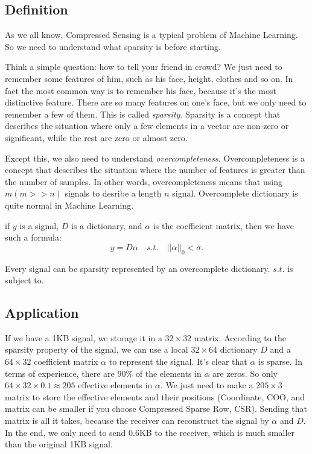 \documentclass[10pt,a4paper,oneside,numbers=noenddot]{scrbook}
\theoremstyle{ctplain}
\theoremstyle{ctresult}
\begin{document}
\subsection{Definition}

As we all know, Compressed Sensing is a typical problem of Machine Learning. So we need
to understand what sparsity is before starting.

Think a simple question: how to tell your friend in crowd? We just need to remember some
features of him, such as his face, height, clothes and so on. In fact the most common way
is to remember his face, because it's the most distinctive feature. There are so many
features on one's face, but we only need to remember a few of them. This is called
\emph{sparsity}. Sparsity is a concept that describes the situation where only a few
elements in a vector are non-zero or significant, while the rest are zero or almost zero.

Except this, we also need to understand \emph{overcompleteness}. Overcompleteness is a
concept that describes the situation where the number of features is greater than the
number of samples. In other words, overcompleteness means that using $m (m>>n)$ signals
to desribe a length $n$ signal. Overcomplete dictionary is quite normal in Machine Learning.

if $y$ is a signal, $D$ is a dictionary, and $\alpha$ is the coefficient matrix, then we have
such a formula:
\[
  y = D\alpha \quad s.t. \quad ||\alpha||_0 < \sigma.
\]

Every signal can be sparsity represented by an overcomplete dictionary. $s.t.$ is subject to.


\subsection{Application}

If we have a 1KB signal, we storage it in a $ 32 \times 32$ matrix. According to the sparsity
property of the signal, we can use a local $32 \times 64$ dictionary $D$ and a $64 \times
32$ coefficient matrix $\alpha$ to represent the signal. It's clear that $\alpha$ is sparse.
In terms of experience, there are 90\% of the elements in $\alpha$ are zeros. So only
$64 \times 32 \times 0.1 \approx 205$ effective elements in $\alpha$. We just need to
make a $205 \times 3$ matrix to store the effective elements and their positions (Coordinate,
COO, and matrix can be smaller if you choose Compressed Sparse Row, CSR). Sending that matrix
is all it takes, because the receiver can reconstruct the signal by $\alpha$ and $D$. In the
end, we only need to send 0.6KB to the receiver, which is much smaller than the original 1KB
signal.
\end{document}
